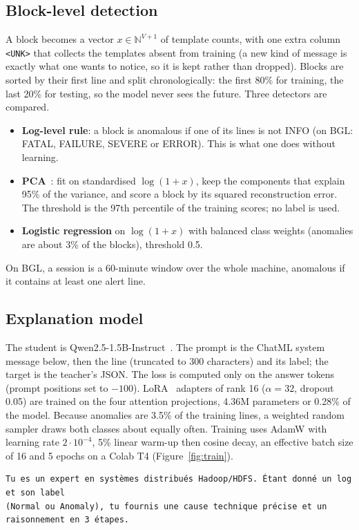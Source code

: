 \documentclass[11pt,a4paper]{article}
\newcommand{\code}[1]{\texttt{#1}}
\begin{document}
\subsection{Block-level detection}
A block becomes a vector $x \in \mathbb{N}^{V+1}$ of template counts, with one extra column
\code{<UNK>} that collects the templates absent from training (a new kind of message is
exactly what one wants to notice, so it is kept rather than dropped). Blocks are sorted by
their first line and split chronologically: the first 80\% for training, the last 20\% for
testing, so the model never sees the future. Three detectors are compared.
\begin{itemize}
  \item \textbf{Log-level rule}: a block is anomalous if one of its lines is not INFO
        (on BGL: FATAL, FAILURE, SEVERE or ERROR). This is what one does without learning.
  \item \textbf{PCA}~\cite{xu2009}: fit on standardised $\log(1+x)$, keep the components that
        explain 95\% of the variance, and score a block by its squared reconstruction error.
        The threshold is the 97th percentile of the training scores; no label is used.
  \item \textbf{Logistic regression} on $\log(1+x)$ with balanced class weights (anomalies are
        about 3\% of the blocks), threshold 0.5.
\end{itemize}
On BGL, a session is a 60-minute window over the whole machine, anomalous if it contains at
least one alert line.

\subsection{Explanation model}
The student is Qwen2.5-1.5B-Instruct~\cite{qwen2025}. The prompt is the ChatML system message
below, then the line (truncated to 300 characters) and its label; the target is the teacher's
JSON. The loss is computed only on the answer tokens (prompt positions set to $-100$).
LoRA~\cite{hu2022} adapters of rank 16 ($\alpha=32$, dropout 0.05) are trained on the four
attention projections, 4.36M parameters or 0.28\% of the model. Because anomalies are 3.5\%
of the training lines, a weighted random sampler draws both classes about equally often.
Training uses AdamW with learning rate $2\cdot10^{-4}$, 5\% linear warm-up then cosine decay,
an effective batch size of 16 and 5 epochs on a Colab T4 (Figure~\ref{fig:train}).

\begin{lstlisting}
Tu es un expert en systèmes distribués Hadoop/HDFS. Étant donné un log et son label
(Normal ou Anomaly), tu fournis une cause technique précise et un raisonnement en 3 étapes.
\end{lstlisting}
\end{document}
